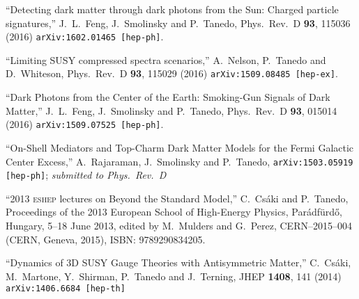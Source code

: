 \documentclass[margin,line]{resume}
\newcommand{\scap}[1]{\textsc{\MakeLowercase{#1}}}
\begin{document}
\begin{resume}
  ``Detecting dark matter through dark photons from the Sun: Charged particle signatures,''
  J.~L.~Feng, J.~Smolinsky and P.~Tanedo,
  Phys.\ Rev.\ D {\bf 93}, 115036 (2016)
  \texttt{arXiv:1602.01465 [hep-ph]}.
  \vspace{-2mm}

  ``Limiting SUSY compressed spectra scenarios,''
    A.~Nelson, P.~Tanedo and D.~Whiteson,
   Phys.\ Rev.\ D {\bf 93}, 115029 (2016)
  \texttt{arXiv:1509.08485 [hep-ex]}.
\vspace{-2mm}


  ``Dark Photons from the Center of the Earth: Smoking-Gun Signals of Dark Matter,''
  J.~L.~Feng, J.~Smolinsky and P.~Tanedo,
  Phys.\ Rev.\ D {\bf 93}, 015014 (2016)
  \texttt{arXiv:1509.07525 [hep-ph]}.

\vspace{-2mm}


``On-Shell Mediators and Top-Charm Dark Matter Models for the Fermi Galactic Center Excess,''
  A.~Rajaraman, J.~Smolinsky and P.~Tanedo,
\texttt{arXiv:1503.05919 [hep-ph]}; \emph{submitted to Phys.~Rev.~D}

\vspace{-2mm}


``2013 \scap{ESHEP} lectures on Beyond the Standard Model,''
  C.~Cs\'aki and P.~Tanedo, %
Proceedings of the 2013 European School of High-Energy Physics, Par\'{a}df\"{u}rd\H{o}, Hungary, 5--18 June 2013, edited by M.~Mulders and G.~Perez, CERN--2015--004 (CERN, Geneva, 2015), ISBN: 9789290834205.


\vspace{-2mm}


``Dynamics of 3D SUSY Gauge Theories with Antisymmetric Matter,''
  C.~Csáki, M.~Martone, Y.~Shirman, P.~Tanedo and J.~Terning,
  JHEP {\bf 1408}, 141 (2014)
\texttt{arXiv:1406.6684 [hep-th]} 

\vspace{-2mm}
 

\end{resume}
\end{document}
